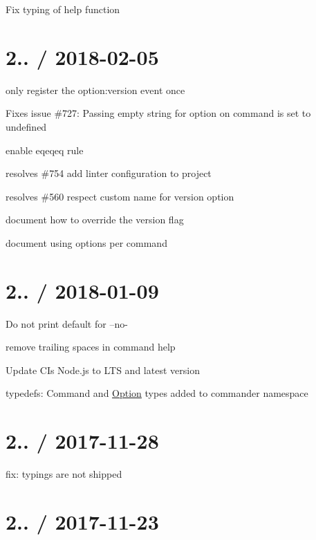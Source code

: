 \begin{DoxyItemize}
\item Fix typing of help function
\end{DoxyItemize}

\section*{2.. / 2018-\/02-\/05 }


\begin{DoxyItemize}
\item only register the option\+:version event once
\item Fixes issue \#727\+: Passing empty string for option on command is set to undefined
\item enable eqeqeq rule
\item resolves \#754 add linter configuration to project
\item resolves \#560 respect custom name for version option
\item document how to override the version flag
\item document using options per command
\end{DoxyItemize}

\section*{2.. / 2018-\/01-\/09 }


\begin{DoxyItemize}
\item Do not print default for --no-\/
\item remove trailing spaces in command help
\item Update CI\textquotesingle{}s Node.\+js to L\+TS and latest version
\item typedefs\+: Command and \mbox{\hyperlink{structOption}{Option}} types added to commander namespace
\end{DoxyItemize}

\section*{2.. / 2017-\/11-\/28 }


\begin{DoxyItemize}
\item fix\+: typings are not shipped
\end{DoxyItemize}

\section*{2.. / 2017-\/11-\/23 }


